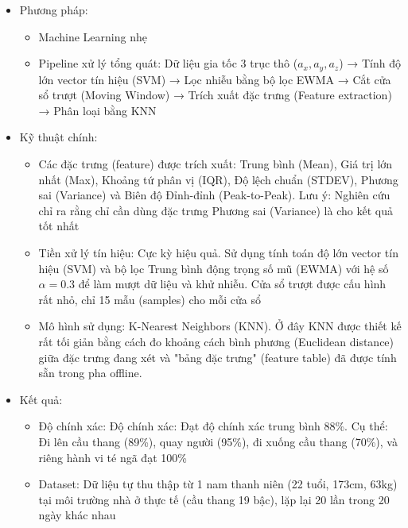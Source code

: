 \documentclass[../DoAn.tex]{subfiles}
\begin{document}
\begin{enumerate}[label=\arabic*)]
\begin{itemize}
\begin{itemize}
            \item Cảm biến sử dụng: Gia tốc kế 3 trục (tri-axial accelerometer) GY-521
            \item Vị trí đặt cảm biến: Đeo ở thắt lưng (waist) vì tính tiện dụng cao nhất sau khi đã thử nghiệm nghiệm cả ở ngực
            \item Tần số lấy mẫu:Chu kỳ lấy mẫu là 100 ms (tương đương 10 Hz)
        \end{itemize}
        \item Phương pháp:
        \begin{itemize}
            \item Machine Learning nhẹ
            \item Pipeline xử lý tổng quát: Dữ liệu gia tốc 3 trục thô ($a_x, a_y, a_z$) → Tính độ lớn vector tín hiệu (SVM) → Lọc nhiễu bằng bộ lọc EWMA → Cắt cửa sổ trượt (Moving Window) → Trích xuất đặc trưng (Feature extraction) → Phân loại bằng KNN
        \end{itemize}
        \item Kỹ thuật chính:
        \begin{itemize}
            \item Các đặc trưng (feature) được trích xuất: Trung bình (Mean), Giá trị lớn nhất (Max), Khoảng tứ phân vị (IQR), Độ lệch chuẩn (STDEV), Phương sai (Variance) và Biên độ Đỉnh-đỉnh (Peak-to-Peak). Lưu ý: Nghiên cứu chỉ ra rằng chỉ cần dùng đặc trưng Phương sai (Variance) là cho kết quả tốt nhất
            \item Tiền xử lý tín hiệu: Cực kỳ hiệu quả. Sử dụng tính toán độ lớn vector tín hiệu (SVM) và bộ lọc Trung bình động trọng số mũ (EWMA) với hệ số $\alpha=0.3$ để làm mượt dữ liệu và khử nhiễu. Cửa sổ trượt được cấu hình rất nhỏ, chỉ 15 mẫu (samples) cho mỗi cửa sổ
            \item Mô hình sử dụng: K-Nearest Neighbors (KNN). Ở đây KNN được thiết kế rất tối giản bằng cách đo khoảng cách bình phương (Euclidean distance) giữa đặc trưng đang xét và "bảng đặc trưng" (feature table) đã được tính sẵn trong pha offline.
        \end{itemize}
        \item Kết quả: 
        \begin{itemize}
            \item Độ chính xác: Độ chính xác: Đạt độ chính xác trung bình 88\%. Cụ thể: Đi lên cầu thang (89\%), quay người (95\%), đi xuống cầu thang (70\%), và riêng hành vi té ngã đạt 100\%
            \item Dataset: Dữ liệu tự thu thập từ 1 nam thanh niên (22 tuổi, 173cm, 63kg) tại môi trường nhà ở thực tế (cầu thang 19 bậc), lặp lại 20 lần trong 20 ngày khác nhau

\end{itemize}
\end{itemize}
\end{enumerate}
\end{document}
